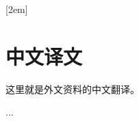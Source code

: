 
[2em]{\vspace{.5\baselineskip}\xiaosan\song}
             {\prechaptername\CJKnumber{\thecontentslabel}\postchaptername\qquad}{}
             {}             %
\chapter*{中文译文}

这里就是外文资料的中文翻译。

...
